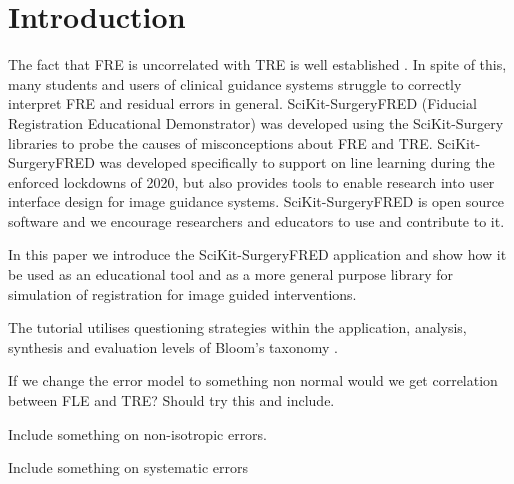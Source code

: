 \section{Introduction}
The fact that \gls{FRE} is uncorrelated with \gls{TRE} is well established 
\cite{fitzpatrick2009}. In spite of this, many students and users of clinical guidance systems struggle to 
correctly interpret \gls{FRE} and residual errors in general. 
SciKit-SurgeryFRED (Fiducial Registration Educational Demonstrator)
 \cite{stephen_thompson_2020_3946090} was developed using the 
SciKit-Surgery \cite{PMID:32436132} libraries to probe the causes of misconceptions 
about \gls{FRE} and \gls{TRE}. SciKit-SurgeryFRED was developed specifically to support on line learning during the enforced lockdowns of 2020, but also provides tools to enable research into user interface design for image guidance systems. SciKit-SurgeryFRED is open 
source software and we encourage researchers and educators to use and contribute to it. 

In this paper we introduce the SciKit-SurgeryFRED application and show how it
be used as an educational tool and as a more general purpose library for
simulation of registration for image guided interventions.

The tutorial utilises questioning strategies within the application, analysis, synthesis and evaluation levels of Bloom's taxonomy \cite{blooms_tax}.

If we change the error model to something non normal would we get correlation between FLE and TRE? Should try this and include.

Include something on non-isotropic errors.

Include something on systematic errors

